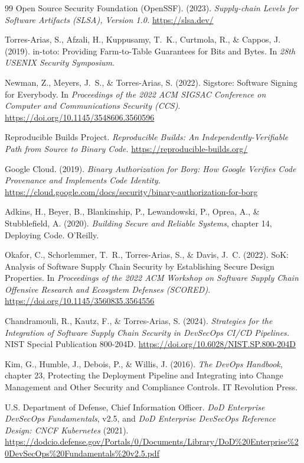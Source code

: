 \documentclass[11pt]{article}
\begin{document}
\begin{thebibliography}{99}
Open Source Security Foundation (OpenSSF). (2023). \textit{Supply-chain Levels for Software Artifacts (SLSA), Version 1.0.} \url{https://slsa.dev/}

Torres-Arias, S., Afzali, H., Kuppusamy, T.~K., Curtmola, R., \& Cappos, J. (2019). in-toto: Providing Farm-to-Table Guarantees for Bits and Bytes. In \textit{28th USENIX Security Symposium}.

Newman, Z., Meyers, J.~S., \& Torres-Arias, S. (2022). Sigstore: Software Signing for Everybody. In \textit{Proceedings of the 2022 ACM SIGSAC Conference on Computer and Communications Security (CCS)}. \url{https://doi.org/10.1145/3548606.3560596}

Reproducible Builds Project. \textit{Reproducible Builds: An Independently-Verifiable Path from Source to Binary Code.} \url{https://reproducible-builds.org/}

Google Cloud. (2019). \textit{Binary Authorization for Borg: How Google Verifies Code Provenance and Implements Code Identity.} \url{https://cloud.google.com/docs/security/binary-authorization-for-borg}

Adkins, H., Beyer, B., Blankinship, P., Lewandowski, P., Oprea, A., \& Stubblefield, A. (2020). \textit{Building Secure and Reliable Systems}, chapter 14, Deploying Code. O'Reilly.

Okafor, C., Schorlemmer, T.~R., Torres-Arias, S., \& Davis, J.~C. (2022). SoK: Analysis of Software Supply Chain Security by Establishing Secure Design Properties. In \textit{Proceedings of the 2022 ACM Workshop on Software Supply Chain Offensive Research and Ecosystem Defenses (SCORED)}. \url{https://doi.org/10.1145/3560835.3564556}

Chandramouli, R., Kautz, F., \& Torres-Arias, S. (2024). \textit{Strategies for the Integration of Software Supply Chain Security in DevSecOps CI/CD Pipelines.} NIST Special Publication 800-204D. \url{https://doi.org/10.6028/NIST.SP.800-204D}

Kim, G., Humble, J., Debois, P., \& Willis, J. (2016). \textit{The DevOps Handbook}, chapter 23, Protecting the Deployment Pipeline and Integrating into Change Management and Other Security and Compliance Controls. IT Revolution Press.

U.S. Department of Defense, Chief Information Officer. \textit{DoD Enterprise DevSecOps Fundamentals}, v2.5, and \textit{DoD Enterprise DevSecOps Reference Design: CNCF Kubernetes} (2021). \url{https://dodcio.defense.gov/Portals/0/Documents/Library/DoD%20Enterprise%20DevSecOps%20Fundamentals%20v2.5.pdf}


\end{thebibliography}
\end{document}
